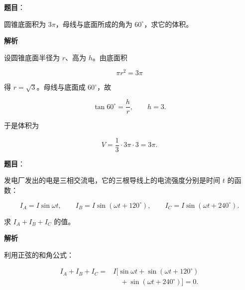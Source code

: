 \begin{answer}

\textbf{题目}：

圆锥底面积为 $3\pi$，母线与底面所成的角为 $60^\circ$，求它的体积。

\textbf{解析}

设圆锥底面半径为 $r$、高为 $h$。由底面积

\nopagebreak[4]
\[
\pi r^2=3\pi
\]

得 $r=\sqrt3$。母线与底面成 $60^\circ$，故

\nopagebreak[4]
\[
\tan60^\circ=\frac hr,
\qquad h=3.
\]

于是体积为

\nopagebreak[4]
\[
V=\frac13\cdot3\pi\cdot3=3\pi.
\]


\end{answer}
\begin{answer}

\textbf{题目}：

发电厂发出的电是三相交流电，它的三根导线上的电流强度分别是时间 $t$ 的函数：

\nopagebreak[4]
\[
I_A=I\sin\omega t,\qquad
I_B=I\sin(\omega t+120^\circ),\qquad
I_C=I\sin(\omega t+240^\circ).
\]

求 $I_A+I_B+I_C$ 的值。

\textbf{解析}

利用正弦的和角公式：

\nopagebreak[4]
\[
\begin{aligned}
I_A+I_B+I_C
={}&I[\sin\omega t+\sin(\omega t+120^\circ)\\
&\quad+\sin(\omega t+240^\circ)]=0.
\end{aligned}
\]


\end{answer}
